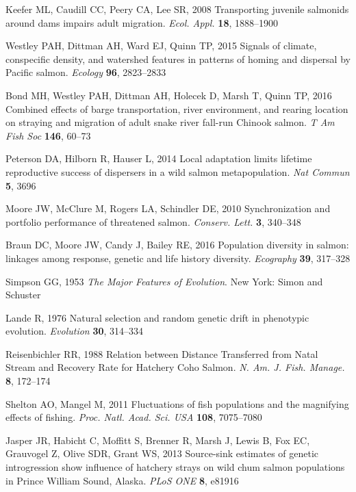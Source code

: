 \documentclass{revtex4}
\begin{document}
\begin{thebibliography}{10}
Keefer ML, Caudill CC, Peery CA, Lee SR, 2008 {Transporting juvenile salmonids
  around dams impairs adult migration}.
\newblock \emph{Ecol. Appl.} \textbf{18}, 1888--1900

Westley PAH, Dittman AH, Ward EJ, Quinn TP, 2015 {Signals of climate,
  conspecific density, and watershed features in patterns of homing and
  dispersal by Pacific salmon.}
\newblock \emph{Ecology} \textbf{96}, 2823--2833

Bond MH, Westley PAH, Dittman AH, Holecek D, Marsh T, Quinn TP, 2016 {Combined
  effects of barge transportation, river environment, and rearing location on
  straying and migration of adult snake river fall-run Chinook salmon}.
\newblock \emph{T Am Fish Soc} \textbf{146}, 60--73

Peterson DA, Hilborn R, Hauser L, 2014 {Local adaptation limits lifetime
  reproductive success of dispersers in a wild salmon metapopulation}.
\newblock \emph{Nat Commun} \textbf{5}, 3696

Moore JW, McClure M, Rogers LA, Schindler DE, 2010 {Synchronization and
  portfolio performance of threatened salmon}.
\newblock \emph{Conserv. Lett.} \textbf{3}, 340--348

Braun DC, Moore JW, Candy J, Bailey RE, 2016 {Population diversity in salmon:
  linkages among response, genetic and life history diversity}.
\newblock \emph{Ecography} \textbf{39}, 317--328

Simpson GG, 1953 \emph{{The Major Features of Evolution}}.
\newblock New York: Simon and Schuster

Lande R, 1976 {Natural selection and random genetic drift in phenotypic
  evolution}.
\newblock \emph{Evolution} \textbf{30}, 314--334

Reisenbichler RR, 1988 {Relation between Distance Transferred from Natal Stream
  and Recovery Rate for Hatchery Coho Salmon}.
\newblock \emph{N. Am. J. Fish. Manage.} \textbf{8}, 172--174

Shelton AO, Mangel M, 2011 {Fluctuations of fish populations and the magnifying
  effects of fishing.}
\newblock \emph{Proc. Natl. Acad. Sci. USA} \textbf{108}, 7075--7080

Jasper JR, Habicht C, Moffitt S, Brenner R, Marsh J, Lewis B, Fox EC, Grauvogel
  Z, Olive SDR, Grant WS, 2013 {Source-sink estimates of genetic introgression
  show influence of hatchery strays on wild chum salmon populations in Prince
  William Sound, Alaska}.
\newblock \emph{PLoS ONE} \textbf{8}, e81916


\end{thebibliography}
\end{document}

